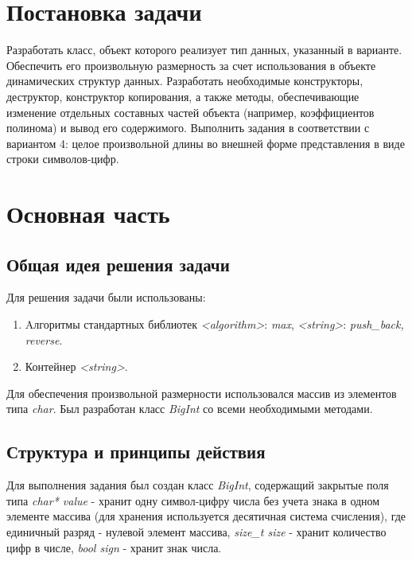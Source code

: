 \documentclass[a4paper,14pt]{article}
\begin{document}

\setcounter{page}{2} %

\renewcommand\contentsname{\centering {\normalsize Содержание}}
\tableofcontents
\newpage

\section*{Постановка задачи}

Разработать класс, объект которого реализует тип данных, указанный в варианте. Обеспечить его произвольную размерность за счет использования в объекте динамических структур данных. Разработать
необходимые конструкторы, деструктор, конструктор копирования, а также методы, обеспечивающие
изменение отдельных составных частей объекта (например, коэффициентов полинома) и вывод его содержимого. Выполнить задания в соответствии с вариантом 4: целое произвольной длины во внешней форме представления в виде строки символов-цифр.

\newpage

\section{Основная часть}
\subsection{Общая идея решения задачи}
Для решения задачи были использованы:
\begin{enumerate}
	\item Aлгоритмы стандартных библиотек \textit{<algorithm>}: \textit{max}, \textit{<string>}: \textit{push\_back, reverse}.
	\item Контейнер \textit{<string>}.
\end{enumerate}
Для обеспечения произвольной размерности использовался массив из элементов типа \textit{char}. Был разработан класс \textit{BigInt} со всеми необходимыми методами. 
\subsection{Структура и принципы действия}
Для выполнения задания был создан класс \textit{BigInt}, содержащий закрытые поля типа \textit{char* value} - хранит одну символ-цифру числа без учета знака в одном элементе массива (для хранения используется десятичная система счисления), где единичный разряд - нулевой элемент массива, \textit{size\_t size} - хранит количество цифр в числе, \textit{bool sign} - хранит знак числа.
\end{document}
